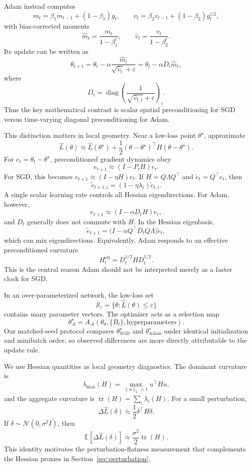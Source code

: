 \documentclass[11pt]{article}
\begin{document}
Adam instead computes
\[
m_t=\beta_1m_{t-1}+(1-\beta_1)g_t,\qquad
v_t=\beta_2v_{t-1}+(1-\beta_2)g_t^{\odot 2},
\]
with bias-corrected moments
\[
\hat m_t=\frac{m_t}{1-\beta_1^t},\qquad
\hat v_t=\frac{v_t}{1-\beta_2^t}.
\]
Its update can be written as
\[
\theta_{t+1}=\theta_t-\alpha\frac{\hat m_t}{\sqrt{\hat v_t}+\varepsilon}
=\theta_t-\alpha D_t\hat m_t,
\]
where
\[
D_t=\operatorname{diag}\!\left(\frac{1}{\sqrt{\hat v_{t,i}}+\varepsilon}\right)_i.
\]
Thus the key mathematical contrast is scalar spatial preconditioning for SGD versus time-varying diagonal preconditioning for Adam.

This distinction matters in local geometry. Near a low-loss point $\theta^\star$, approximate
\[
\widehat L(\theta)\approx \widehat L(\theta^\star)+\frac12(\theta-\theta^\star)^\top H(\theta-\theta^\star).
\]
For $e_t=\theta_t-\theta^\star$, preconditioned gradient dynamics obey
\[
e_{t+1}\approx (I-P_tH)e_t.
\]
For SGD, this becomes $e_{t+1}\approx (I-\eta H)e_t$. If $H=Q\Lambda Q^\top$ and $\tilde e_t=Q^\top e_t$, then
\[
\tilde e_{t+1,i}=(1-\eta\lambda_i)\tilde e_{t,i}.
\]
A single scalar learning rate controls all Hessian eigendirections. For Adam, however,
\[
e_{t+1}\approx (I-\alpha D_tH)e_t,
\]
and $D_t$ generally does not commute with $H$. In the Hessian eigenbasis,
\[
\tilde e_{t+1}=\bigl(I-\alpha Q^\top D_tQ\Lambda\bigr)\tilde e_t,
\]
which can mix eigendirections. Equivalently, Adam responds to an effective preconditioned curvature
\[
H_t^{\mathrm{eff}}=D_t^{1/2}HD_t^{1/2}.
\]
This is the central reason Adam should not be interpreted merely as a faster clock for SGD.

In an over-parameterized network, the low-loss set
\[
\mathcal S_\varepsilon=\{\theta:\widehat L(\theta)\le \varepsilon\}
\]
contains many parameter vectors. The optimizer acts as a selection map
\[
\theta^\star_{\mathcal A}=A_{\mathcal A}(\theta_0,\{B_t\},\text{hyperparameters}).
\]
Our matched-seed protocol compares $\theta^\star_{\mathrm{SGD}}$ and $\theta^\star_{\mathrm{Adam}}$ under identical initialization and minibatch order, so observed differences are more directly attributable to the update rule.

We use Hessian quantities as local geometry diagnostics. The dominant curvature is
\[
\lambda_{\max}(H)=\max_{\|u\|_2=1}u^\top Hu,
\]
and the aggregate curvature is $\operatorname{tr}(H)=\sum_i\lambda_i(H)$. For a small perturbation,
\[
\Delta\widehat L(\delta)\approx \frac12\delta^\top H\delta.
\]
If $\delta\sim\mathcal N(0,\sigma^2I)$, then
\[
\mathbb E[\Delta\widehat L(\delta)]\approx \frac{\sigma^2}{2}\operatorname{tr}(H).
\]
This identity motivates the perturbation-flatness measurement that complements the Hessian proxies in Section~\ref{sec:perturbation}.
\end{document}
